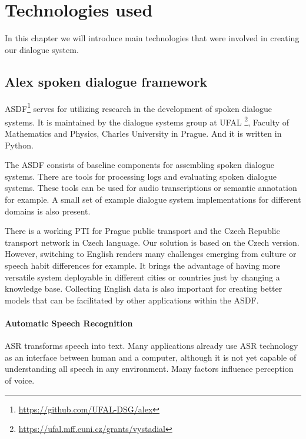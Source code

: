 \chapter{Technologies used}

In this chapter we will introduce main technologies that were involved in creating our dialogue system.

\section{Alex spoken dialogue framework}

\acf{ASDF}\footnote{\url{https://github.com/UFAL-DSG/alex}} serves for utilizing research in the development of spoken dialogue systems.
It is maintained by the dialogue systems group at \acf{UFAL} \footnote{\url{https://ufal.mff.cuni.cz/grants/vystadial}}, Faculty of Mathematics and Physics, Charles University in Prague.
And it is written in Python.

The \ac{ASDF} consists of baseline components for assembling spoken dialogue systems.
There are tools for processing logs and evaluating spoken dialogue systems.
These tools can be used for audio transcriptions or semantic annotation for example.
A small set of example dialogue system implementations for different domains is also present.

There is a working \acf{PTI} \cite{ptics} for Prague public transport and the Czech Republic transport network in Czech language.
Our solution is based on the Czech version.
However, switching to English renders many challenges emerging from culture or speech habit differences for example.
It brings the advantage of having more versatile system deployable in different cities or countries just by changing a knowledge base.
Collecting English data is also important for creating better models that can be facilitated by other applications within the \ac{ASDF}.


\subsubsection{Automatic Speech Recognition}

\acf{ASR} transforms speech into text.
Many applications already use \ac{ASR} technology as an interface between human and a computer, although it is not yet capable of understanding all speech in any environment.
Many factors influence perception of voice.

